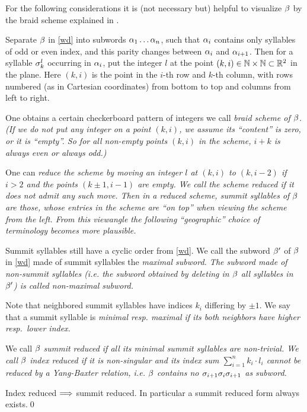 For the following considerations it is (not necessary but) helpful
to visualize $\beta$ by the braid scheme explained in \cite{bind}.

Separate $\beta$ in
\eqref{wd} into subwords $\alpha_1\dots \alpha_n$, such that $\alpha_i$
contains only syllables of odd or even index, and this parity
changes between $\alpha_i$ and $\alpha_{i+1}$. Then for a syllable
$\sigma_k^l$ occurring in $\alpha_i$, put the integer $l$ at the point
$(k,i)\in {\Bbb N}\times {\Bbb N}\subset {\Bbb R}^2$ in the plane. Here $(k,i)$
is the point in the $i$-th row and $k$-th column, with rows
numbered (as in Cartesian coordinates) from bottom to top and
columns from left to right.

One obtains a certain checkerboard pattern of integers we call
\em{braid scheme} of $\beta$. (If we do not put any integer on
a point $(k,i)$, we assume its ``content'' is zero, or it is
``empty''. So for all non-empty points $(k,i)$ in the scheme,
$i+k$ is always even or always odd.)

One can \em{reduce} the
scheme by moving an integer $l$ at $(k,i)$ to $(k,i-2)$ if $i>2$
and the points $(k\pm 1,i-1)$ are empty. We call the scheme
reduced if it does not admit any such move. Then in a reduced
scheme, summit syllables of $\beta$ are those, whose entries in
the scheme are ``on top'' when viewing the scheme from the left.
{}From this viewangle the following ``geographic'' choice of
terminology becomes more plausible.


\begin{defi}
Summit syllables still have a cyclic order from \eqref{wd}. We call
the subword $\beta'$ of $\beta$ in \eqref{wd} made of summit syllables
the \em{maximal subword}. The subword made of non-summit syllables
(i.e. the subword obtained by deleting in $\beta$ all syllables in
$\beta'$) is called \em{non-maximal subword}. 

Note that neighbored summit syllables have indices $k_i$ differing
by $\pm 1$. We say that a summit syllable is \em{minimal} resp.
\em{maximal} if its both neighbors have higher resp.\ lower index.

We call $\beta$ \em{summit reduced} if all its minimal summit syllables
are non-trivial.  We call $\beta$ \em{index reduced} if it is
non-singular and its index sum $\sum_{i=1}^n k_i\cdot l_i$ cannot be
reduced by a Yang-Baxter relation, i.e. $\beta$ contains no
$\sigma_{i+1}\sigma_i\sigma_{i+1}$ as subword.
\end{defi}

\begin{lemma}
Index reduced $\Longrightarrow$ summit reduced. In particular a summit reduced
form always exists.\qed
\end{lemma}

